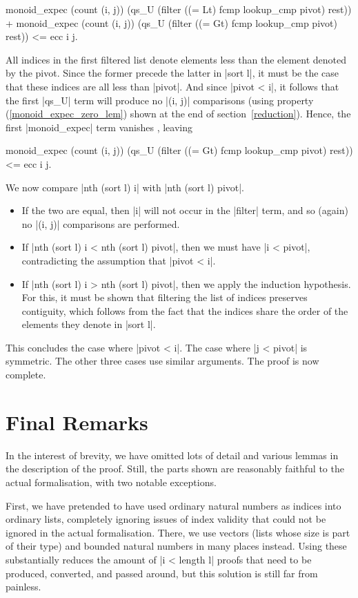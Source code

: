 \documentclass[runningheads]{llncs}
\begin{document}
\begin{code}
monoid_expec (count (i, j)) (qs_U (filter ((= Lt) fcmp lookup_cmp pivot) rest)) +
monoid_expec (count (i, j)) (qs_U (filter ((= Gt) fcmp lookup_cmp pivot) rest))
  <= ecc i j.
\end{code}
All indices in the first filtered list denote elements 
less than the element denoted by the pivot. Since the former precede the latter in |sort l|, it must be the case that these indices are all less than |pivot|. And since |pivot < i|, it follows that the first |qs_U| term will produce no |(i, j)| comparisons (using property 
   (\ref{monoid_expec_zero_lem})  
shown at the end of section~\ref{reduction}). Hence, the first |monoid_expec| term vanishes%
, leaving
\begin{code}
monoid_expec (count (i, j))
  (qs_U (filter ((= Gt) fcmp lookup_cmp pivot) rest)) <= ecc i j.
\end{code}
We now compare |nth (sort l) i| with |nth (sort l) pivot|.
\begin{itemize}
\item If the two are equal, then |i| will not occur in the |filter| term, and so (again) no |(i, j)| comparisons are performed.
\item If |nth (sort l) i < nth (sort l) pivot|, then we must have |i < pivot|, contradicting the assumption that |pivot < i|.
\item If |nth (sort l) i > nth (sort l) pivot|, then we apply the induction hypothesis. For this, it must be shown that filtering the list of indices preserves contiguity, which follows from the fact that the indices share the order of the elements they denote in |sort l|.
\end{itemize}
This concludes the case where |pivot < i|. The case where |j < pivot| is symmetric. The other three cases use similar arguments.
The proof is now complete.

\section{Final Remarks}
\label{conclusion}

In the interest of brevity, we have omitted lots of detail and various lemmas in the description of the proof. Still, the parts shown are reasonably faithful to the actual formalisation, with two notable exceptions.

First, we have pretended to have used ordinary natural numbers as indices into ordinary lists, completely ignoring issues of index validity that could not be ignored in the actual formalisation. There, we use vectors (lists whose size is part of their type) and bounded natural numbers in many places instead. Using these substantially reduces the amount of |i < length l| proofs that need to be produced, converted, and passed around, but this solution is still far from painless.
\end{document}
